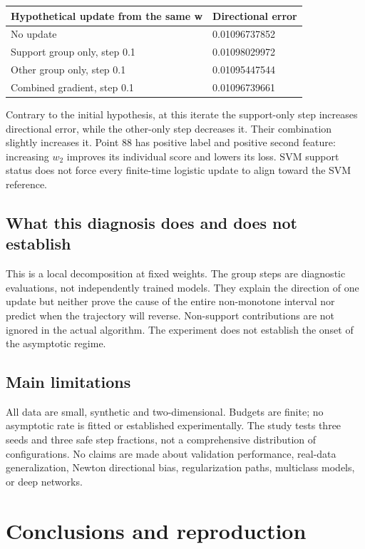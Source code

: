 \documentclass[12pt,a4paper]{article}
\begin{document}
\begin{center}
\small
\begin{tabular}{@{}p{}p{}@{}}
\toprule
\textbf{Hypothetical update from the same w} & \textbf{Directional error} \\
\midrule
No update & 0.01096737852 \\
Support group only, step 0.1 & 0.01098029972 \\
Other group only, step 0.1 & 0.01095447544 \\
Combined gradient, step 0.1 & 0.01096739661 \\
\bottomrule
\end{tabular}
\end{center}
Contrary to the initial hypothesis, at this iterate the support-only step increases directional error, while the other-only step decreases it. Their combination slightly increases it. Point 88 has positive label and positive second feature: increasing $w_2$ improves its individual score and lowers its loss. SVM support status does not force every finite-time logistic update to align toward the SVM reference.

\subsection{What this diagnosis does and does not establish}
This is a local decomposition at fixed weights. The group steps are diagnostic evaluations, not independently trained models. They explain the direction of one update but neither prove the cause of the entire non-monotone interval nor predict when the trajectory will reverse. Non-support contributions are not ignored in the actual algorithm. The experiment does not establish the onset of the asymptotic regime.

\subsection{Main limitations}
All data are small, synthetic and two-dimensional. Budgets are finite; no asymptotic rate is fitted or established experimentally. The study tests three seeds and three safe step fractions, not a comprehensive distribution of configurations. No claims are made about validation performance, real-data generalization, Newton directional bias, regularization paths, multiclass models, or deep networks.

\FloatBarrier
\section{Conclusions and reproduction}
\end{document}

